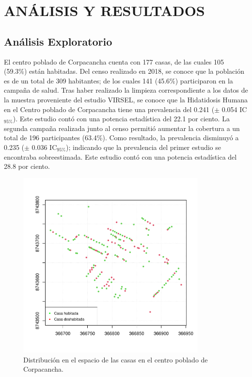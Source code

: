 \chapter{ANÁLISIS Y RESULTADOS}

\section{Análisis Exploratorio}
El centro poblado de Corpacancha cuenta con 177 casas, de las cuales 105 (59.3\%) están habitadas. Del censo realizado en 2018, se conoce que la población es de un total de 309 habitantes; de los cuales 141 (45.6\%) participaron en la campaña de salud. Tras haber realizado la limpieza correspondiente a los datos de la muestra proveniente del estudio VIRSEL, se conoce que la Hidatidosis Humana en el Centro poblado de Corpacancha tiene una prevalencia del 0.241 ($\pm$ 0.054 IC$_{95\%}$). Este estudio contó con una potencia estadística del 22.1 por ciento. La segunda campaña realizada junto al censo permitió aumentar la cobertura a un total de 196 participantes (63.4\%). Como resultado, la prevalencia disminuyó a 0.235 ($\pm$ 0.036 IC$_{95\%}$); indicando que la prevalencia del primer estudio se encontraba sobreestimada. Este estudio contó con una potencia estadística del 28.8 por ciento.

\newpage

\begin{figure}[h]\label{houses}
	\begin{center}
		\includegraphics[width=0.85\textwidth]{graficos/houses.pdf}
	\end{center}
	\caption{Distribución en el espacio de las casas en el centro poblado de Corpacancha.}
\end{figure}


